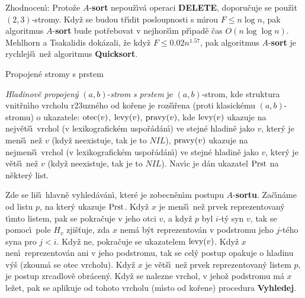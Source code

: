 \flushpar Zhodnocen\'\i : Proto\v ze $A$-{\bf sort} nepou\v z\'\i v\'a operaci 
{\bf DELETE}, doporu\v cuje se pou\v z\'\i t $(2,3)$-stromy. Kdy\v z se 
budou t\v r\'\i dit posloupnosti s m\'\i rou $F\le n\log n$, pak 
algoritmus $A$-{\bf sort} bude pot\v re\-bo\-vat v nejhor\v s\'\i m p\v r\'\i pad\v e 
\v cas $O(n\log\log n)$. Mehlhorn a Tsa\-kalidis dok\'azali, \v ze kdy\v z 
$F\le 0.02n^{1.57}$, pak algoritmus $A$-{\bf sort} je rychlej\v s\'\i\ ne\v z 
algoritmus {\bf Quicksort}.

\subhead
Propojen\'e stromy s prstem
\endsubhead

\flushpar\emph{Hladinov\v e} \emph{propojen\'y} $(a,b)$-\emph{strom} \emph{s} 
\emph{prstem} je $(a,b)$-strom, kde struktura vnit\v rn\'\i ho 
vrcholu r\accent23uzn\'eho od ko\v rene je 
roz\v s\'\i\v rena (proti klasick\'emu $(a,b)$-stromu) o 
ukazatele:\newline 
$\operatorname{otec}(v)$, $\operatorname{levy}(v)$, $\operatorname{pravy}(v)$, kde\newline 
$\operatorname{levy}(v)$ ukazuje na nejv\v et\v s\'\i\ vrchol (v lexikografic\-k\'em 
uspo\v r\'a\-d\'a\-n\'\i ) ve stejn\'e hladin\v e jako $v$, kter\'y je men\v s\'\i\ ne\v z 
$v$ (kdy\v z neexistuje, tak je to $NIL$),\newline 
$\operatorname{pravy}(v)$ ukazuje na nejmen\v s\'\i\ vrchol (v lexikografic\-k\'em 
uspo\v r\'a\-d\'a\-n\'\i ) ve stejn\'e hladin\v e jako $v$, kter\'y je v\v et\v s\'\i\ ne\v z 
$v$ (kdy\v z ne\-existuje, tak je to $NIL$).\newline 
Nav\'\i c je d\'an ukazatel 
$\operatorname{Prst}$ na n\v ekter\'y list. 
\medskip

\flushpar Zde se li\v s\'\i\ hlavn\v e vyhled\'av\'an\'\i , kter\'e je zobecn\v en\'\i m 
postupu $A$-{\bf sortu}. Za\v c\'\i n\'ame od listu $p$, na kter\'y ukazuje 
$\operatorname{Prst}$. Kdy\v z $x$ je men\v s\'\i\ ne\v z prvek reprezentovan\'y t\'\i mto 
listem, pak se pokra\v cuje v jeho otci $v$, a kdy\v z $p$ 
byl $i$-t\'y syn $v$, tak se pomoc\'\i\ pole $H_v$ zji\v s\v tuje, zda $
x$ 
nem\'a b\'yt reprezentov\'an v podstromu jeho $j$-t\'eho syna pro 
$j<i$. Kdy\v z ne, pokra\v cuje se  ukazatelem $\operatorname{levy}(v)$. 
Kdy\v z $x$ nen\'\i\ reprezentov\'an ani v jeho podstromu, 
tak se cel\'y postup opakuje o hladinu v\'y\v s (zkoum\'a se otec vrcholu). 
Kdy\v z $x$ je v\v et\v s\'\i\ ne\v z prvek reprezentovan\'y listem $
p$, 
je postup zrcadlov\v e obr\'acen\'y. Kdy\v z se nalezne 
vrchol, v jeho\v z podstromu m\'a $x$ le\v zet, pak se aplikuje od 
tohoto vrcholu (m\'\i sto od ko\v rene) procedura {\bf Vyhledej}.
\newpage

